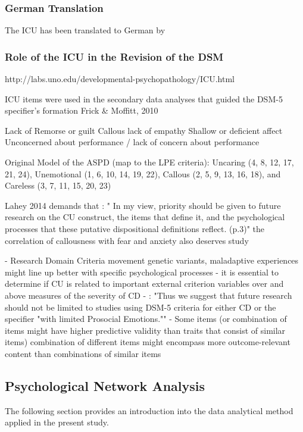 \subsubsection{German Translation}
The ICU has been translated to German by 


\subsubsection{Role of the ICU in the Revision of the DSM}
http://labs.uno.edu/developmental-psychopathology/ICU.html

ICU items were used in the secondary data analyses that guided the DSM-5 specifier's formation
Frick \& Moffitt, 2010 

Lack of Remorse or guilt
Callous lack of empathy
Shallow or deficient affect
Unconcerned about performance / lack of concern about performance

Original Model of the ASPD (map to the LPE criteria):
Uncaring (4, 8, 12, 17, 21, 24),
Unemotional (1, 6, 10, 14, 19, 22),
Callous (2, 5, 9, 13, 16, 18), and
Careless (3, 7, 11, 15, 20, 23)


Lahey 2014 demands that :
" In my view, priority should be given to future research on the CU construct,
the items that define it,
and the psychological processes that these putative dispositional definitions reflect. (p.3)"
the correlation of callousness with fear and anxiety also deserves study

- Research Domain Criteria movement genetic variants, maladaptive experiences might line up better with specific psychological processes
- it is essential to determine if CU is related to important external criterion variables over and above measures of the severity of CD
- : 
"Thus we suggest that future research should not be limited to studies using DSM-5 criteria for either CD or the specifier "with limited Prosocial Emotions.""
- Some items (or combination of items might have higher predictive validity than traits that consist of similar items) combination of different items might encompass more outcome-relevant content than combinations of similar items


\subsection{Psychological Network Analysis}

The following section provides an introduction into the data analytical method applied in the present study.

